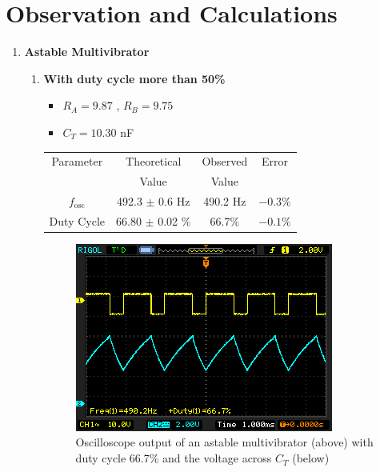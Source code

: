 \section{Observation and Calculations}

\begin{enumerate}

\item \textbf{Astable Multivibrator}
\begin{enumerate}
    \item \textbf{With duty cycle more than 50\%}
        \begin{itemize}
            \item $R_A=9.87$ \kohm, $R_B=9.75$ \kohm
            \item $C_T=10.30$ nF
        \end{itemize}

        \begin{table}[H]
            \centering
            \begin{tabular}{|c|c|c|c|}\hline
                Parameter & Theoretical & Observed & Error \\ 
                          & Value       & Value    &       \\ \hline 
                $f_\text{osc}$   & 492.3 $\pm$ 0.6 Hz & 490.2 Hz & $-0.3\%$  \\ \hline
                Duty Cycle       & 66.80 $\pm$ 0.02 \% & 66.7\%  & $-0.1\%$ \\ \hline
            \end{tabular}
        \end{table}

    \begin{figure}[H]
        \centering
        \includegraphics[width=0.80\columnwidth]{images/astable1.png}
        \caption{Oscilloscope output of an astable multivibrator (above) with duty cycle 66.7\% and the voltage across $C_T$ (below)}
    \end{figure}


\end{enumerate}
\end{enumerate}
